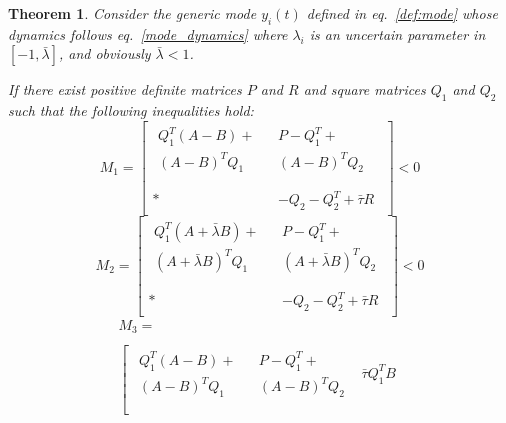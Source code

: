 \documentclass[conference]{IEEEtran}
\newtheorem{theorem}{\textbf{Theorem}}
\begin{document}
\begin{theorem}\label{new_theorem}
Consider the generic mode $y_i(t)$ defined in eq.~\eqref{def:mode} whose dynamics follows eq.~\eqref{mode_dynamics} where $\lambda_i$ is an uncertain parameter in $[-1,\bar \lambda]$, and obviously $\bar \lambda<1$.

If there exist positive definite matrices $P$ and $R$ and square matrices $Q_{1}$ and $Q_{2}$ such that the following inequalities hold:
\begin{equation}\label{LMI1}
M_{1}=\left[\begin{array}{cc}
 \begin{array}{c} Q_{1}^T(A-B)+ \\ (A-B)^TQ_{1} \end{array} & \begin{array}{c} P-Q_{1}^T+ \\ (A-B)^TQ_{2} \end{array}  \\~\\
 *& \begin{array}{c} -Q_{2}-Q_{2}^T  +\bar{\tau}R \end{array}
\end{array} \right]<0
\end{equation}
\begin{equation}\label{LMI2}
M_{2}=\left[\begin{array}{cc}
 \begin{array}{c} Q_{1}^T( A+\bar{\lambda} B)+ \\ ( A+\bar{\lambda} B)^TQ_{1} \end{array} &
 \begin{array}{c} P-Q_{1}^T+ \\ ( A+\bar{\lambda} B)^TQ_{2} \end{array}  \\~\\
 *& \begin{array}{c} -Q_{2}-Q_{2}^T+  \bar{\tau}R \end{array}
\end{array} \right]<0
\end{equation}
\begin{equation}\label{LMI3}
\begin{array}{l} M_3= \\~\\ \left[\begin{array}{ccc}
 \begin{array}{c} Q_{1}^T( A-  B)+\\ (  A- B)^TQ_{1} \end{array} & \begin{array}{c} P-Q_{1}^T+ \\ (  A-  B)^TQ_{2} \end{array} & \bar{\tau} Q_{1}^T B  \\~\\

\end{array}
\end{array}
\end{equation}
\end{theorem}
\end{document}
